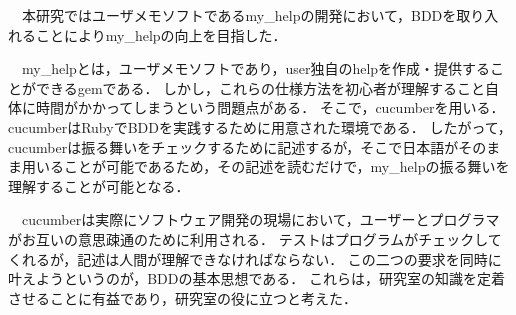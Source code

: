 　本研究ではユーザメモソフトであるmy\_helpの開発において，BDDを取り入れることによりmy\_helpの向上を目指した．

　my\_helpとは，ユーザメモソフトであり，user独自のhelpを作成・提供することができるgemである．
しかし，これらの仕様方法を初心者が理解すること自体に時間がかかってしまうという問題点がある．
そこで，cucumberを用いる．cucumberはRubyでBDDを実践するために用意された環境である．
したがって，cucumberは振る舞いをチェックするために記述するが，そこで日本語がそのまま用いることが可能であるため，その記述を読むだけで，my\_helpの振る舞いを理解することが可能となる．

　cucumberは実際にソフトウェア開発の現場において，ユーザーとプログラマがお互いの意思疎通のために利用される．
テストはプログラムがチェックしてくれるが，記述は人間が理解できなければならない．
この二つの要求を同時に叶えようというのが，BDDの基本思想である．
これらは，研究室の知識を定着させることに有益であり，研究室の役に立つと考えた．

